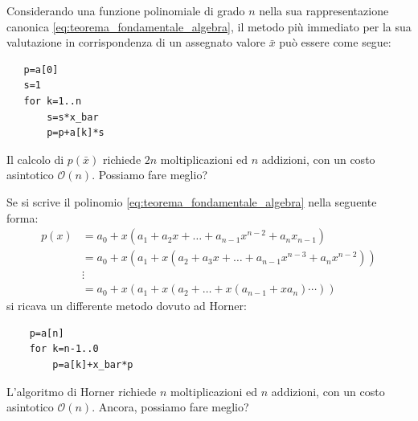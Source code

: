 \documentclass{article}
\numberwithin{equation}{section}
\begin{document}
Considerando una funzione polinomiale di grado $n$ nella sua rappresentazione
canonica \ref{eq:teorema_fondamentale_algebra}, il metodo più immediato per la sua valutazione in corrispondenza di un
assegnato valore $\bar{x}$ può essere come segue:
\begin{verbatim}
   p=a[0]
   s=1
   for k=1..n
       s=s*x_bar
       p=p+a[k]*s
\end{verbatim}
Il calcolo di $p(\bar{x})$ richiede $2n$ moltiplicazioni ed $n$ addizioni, con
un costo asintotico $\mathcal{O}(n)$. Possiamo fare meglio?

Se si scrive il polinomio \ref{eq:teorema_fondamentale_algebra} nella seguente
forma:
\begin{equation}
   \begin{aligned}
       p(x)&=a_0+x(a_1+a_2x+\ldots+a_{n-1}x^{n-2}+a_nx_{n-1}) \\
           &=a_0+x(a_1+x(a_2+a_3x+\ldots+a_{n-1}x^{n-3}+a_nx^{n-2}))\\ 
           &\vdots \\ 
           &=a_0+x(a_1+x(a_2+\ldots+x(a_{n-1}+xa_n)\cdots))
   \end{aligned} 
\end{equation}
si ricava un differente metodo dovuto ad Horner: 
\begin{verbatim}
    p=a[n]
    for k=n-1..0
        p=a[k]+x_bar*p
\end{verbatim}
L'algoritmo di Horner richiede $n$ moltiplicazioni ed $n$ addizioni, con un
costo asintotico $\mathcal{O}(n)$. Ancora, possiamo fare meglio?
\end{document}
